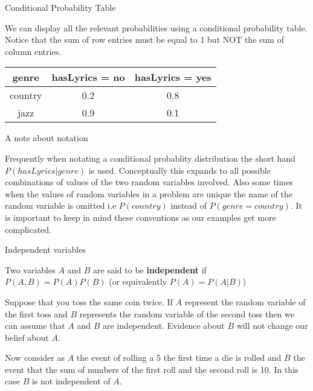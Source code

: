 \documentclass[12pt]{beamer}
\begin{document}
\begin{frame}{Conditional Probability Table}

  We can display all the relevant probabilities using a conditional
  probability table. Notice that the sum of row entries must be equal
  to 1 but NOT the sum of column entries.
  
  \begin{table}
    \begin{tabular}{|c|c|c|}
      \hline 
      genre & hasLyrics = no & hasLyrics = yes \\
      \hline
      country  & 0.2 & 0.8 \\
      \hline 
      jazz & 0.9 & 0.1 \\
      \hline 
      \end{tabular}

    \end{table} 

  \end{frame} 

\begin{frame}{A note about notation}

Frequently when notating a conditional probablity distribution the
short hand $P(hasLyrics|genre)$ is used. Conceptually this expands to
all possible combinations of values of the two random variables
involved. Also some times when the values of random variables in a
problem are unique the name of the random variable is omitted i.e
$P(country)$ instead of $P(genre = country)$. It is important to keep
in mind these conventions as our examples get more complicated.
  
  \end{frame} 



\begin{frame}{Independent variables} 

\begin{definition} 
Two variables $A$ and $B$ are said to be {\bf independent} if $P(A,B) = P(A) P(B)$ (or equivalently $P(A) = P(A|B)$) 
\end{definition} 

Suppose that you toss the same coin twice. If $A$ represent the random
variable of the first toss and $B$ represents the random variable of the
second toss then we can assume that $A$ and $B$ are independent. Evidence
about $B$ will not change our belief about $A$.

Now consider as $A$ the event of rolling a 5 the first time a die is rolled 
and $B$ the event that the sum of numbers of the first roll and the second 
roll is 10. In this case $B$ is not independent of $A$. 

\end{frame} 
\end{document}
